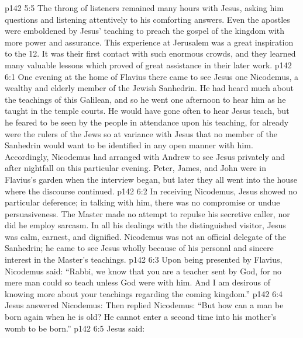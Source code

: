 \vs p142 5:5 \pc The throng of listeners remained many hours with Jesus, asking him questions and listening attentively to his comforting answers. Even the apostles were emboldened by Jesus’ teaching to preach the gospel of the kingdom with more power and assurance. This experience at Jerusalem was a great inspiration to the 12. It was their first contact with such enormous crowds, and they learned many valuable lessons which proved of great assistance in their later work.
\vs p142 6:1 One evening at the home of Flavius there came to see Jesus one Nicodemus, a wealthy and elderly member of the Jewish Sanhedrin. He had heard much about the teachings of this Galilean, and so he went one afternoon to hear him as he taught in the temple courts. He would have gone often to hear Jesus teach, but he feared to be seen by the people in attendance upon his teaching, for already were the rulers of the Jews so at variance with Jesus that no member of the Sanhedrin would want to be identified in any open manner with him. Accordingly, Nicodemus had arranged with Andrew to see Jesus privately and after nightfall on this particular evening. Peter, James, and John were in Flavius’s garden when the interview began, but later they all went into the house where the discourse continued.
\vs p142 6:2 In receiving Nicodemus, Jesus showed no particular deference; in talking with him, there was no compromise or undue persuasiveness. The Master made no attempt to repulse his secretive caller, nor did he employ sarcasm. In all his dealings with the distinguished visitor, Jesus was calm, earnest, and dignified. Nicodemus was not an official delegate of the Sanhedrin; he came to see Jesus wholly because of his personal and sincere interest in the Master’s teachings.
\vs p142 6:3 Upon being presented by Flavius, Nicodemus said: “Rabbi, we know that you are a teacher sent by God, for no mere man could so teach unless God were with him. And I am desirous of knowing more about your teachings regarding the coming kingdom.”
\vs p142 6:4 Jesus answered Nicodemus:  Then replied Nicodemus: “But how can a man be born again when he is old? He cannot enter a second time into his mother’s womb to be born.”
\vs p142 6:5 Jesus said: 
